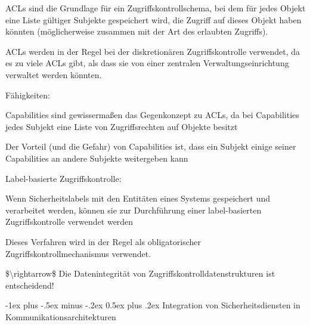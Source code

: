 \documentclass[a4paper]{article}
\makeatletter
\renewcommand{\section}{\@startsection{section}{1}{0mm}%
 {-1ex plus -.5ex minus -.2ex}%
 {0.5ex plus .2ex}%
 {\normalfont\large\bfseries}}
\makeatother
\begin{document}
\begin{multicols}{3}
\begin{itemize*}
            \begin{itemize*}
                  \item ACLs sind die Grundlage für ein Zugriffskontrollschema, bei dem für jedes Objekt eine Liste gültiger Subjekte gespeichert wird, die Zugriff auf dieses Objekt haben könnten (möglicherweise zusammen mit der Art des erlaubten Zugriffs).
                  \item ACLs werden in der Regel bei der diskretionären Zugriffskontrolle verwendet, da es zu viele ACLs gibt, als dass sie von einer zentralen Verwaltungseinrichtung verwaltet werden könnten.
            \end{itemize*}
            \item
            Fähigkeiten:

            \begin{itemize*}
                  \item Capabilities sind gewissermaßen das Gegenkonzept zu ACLs, da bei Capabilities jedes Subjekt eine Liste von Zugriffsrechten auf Objekte besitzt
                  \item Der Vorteil (und die Gefahr) von Capabilities ist, dass ein Subjekt einige seiner Capabilities an andere Subjekte weitergeben kann
            \end{itemize*}
            \item
            Label-basierte Zugriffskontrolle:

            \begin{itemize*}
                  \item Wenn Sicherheitslabels mit den Entitäten eines Systems gespeichert und verarbeitet werden, können sie zur Durchführung einer label-basierten Zugriffskontrolle verwendet werden
                  \item Dieses Verfahren wird in der Regel als obligatorischer Zugriffskontrollmechanismus verwendet.
            \end{itemize*}
            \item
            \$\textbackslash rightarrow\$ Die Datenintegrität von
            Zugriffskontrolldatenstrukturen ist entscheidend!
      \end{itemize*}


      \section{Integration von Sicherheitsdiensten in
        Kommunikationsarchitekturen}



\end{multicols}
\end{document}
